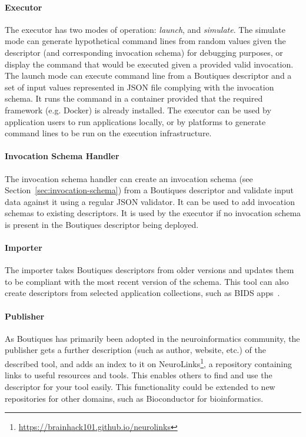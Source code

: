 \documentclass[a4paper,num-refs]{oup-contemporary}
\newcommand{\boutiques}{Boutiques\xspace}
\begin{document}
\paragraph{Executor} The executor has two modes of operation: \emph{launch}, and
\emph{simulate}. The simulate mode can generate hypothetical command lines from
random values given the descriptor (and corresponding invocation schema) for debugging
purposes, or display the command that would be executed given a provided valid
invocation. The launch mode can execute command line from a \boutiques descriptor and
a set of input values represented in JSON file complying with the invocation schema.
It runs the command in a container provided that the required framework (e.g. Docker)
is already installed. The executor can be used by application users to run
applications locally, or by platforms to generate command lines to be run on the
execution infrastructure.

\paragraph{Invocation Schema Handler} The invocation schema handler can create an
invocation schema (see Section~\ref{sec:invocation-schema}) from a \boutiques descriptor
and validate input data against it using a regular JSON validator. It can be used to add
invocation schemas to existing descriptors. It is used by the executor if no invocation
schema is present in the \boutiques descriptor being deployed.

\paragraph{Importer} The importer takes \boutiques descriptors from older versions and
updates them to be compliant with the most recent version of the schema. This tool can
also create descriptors from selected application collections, such as BIDS
apps~\cite{gorgolewski2017bids}.

\paragraph{Publisher} As \boutiques has primarily been adopted in the neuroinformatics
community, the publisher gets a further description (such as author, website, etc.) of
the described tool, and adds an index to it on
NeuroLinks\footnote{\url{https://brainhack101.github.io/neurolinks}}, a repository
containing links to useful resources and tools. This enables others to find and use the
descriptor for your tool easily. This functionality could be extended to
new repositories for other domains, such as Bioconductor for bioinformatics.
\end{document}
